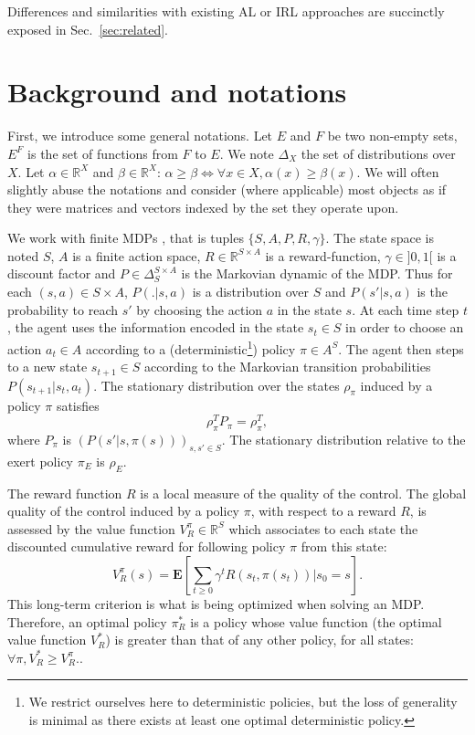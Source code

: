 \documentclass[smallextended]{svjour3}
\newcommand{\E}{\mathbf{E}}
\begin{document}
Differences and similarities with existing AL or IRL approaches are succinctly exposed in Sec.~\ref{sec:related}.
\section{Background and notations}
\label{sec:background}
First, we introduce some general notations.
Let $E$ and $F$ be two non-empty sets, $E^F$ is the set of functions from $F$ to $E$.
We note $\Delta_X$ the set of distributions over $X$.
Let $\alpha\in\mathbb{R}^X$ and $\beta\in\mathbb{R}^X$: $\alpha\geq\beta \Leftrightarrow \forall x\in X, \alpha(x) \geq \beta(x)$. We will often slightly abuse the notations and consider (where applicable) most objects as if they were matrices and vectors indexed by the set they operate upon.

We work with finite MDPs \cite{puterman1994markov}, that is tuples $\{S,A,P,R,\gamma\}$. The state space is noted $S$, $A$ is a finite action space, $R\in\mathbb{R}^{S\times A}$ is a reward-function, $\gamma\in ]0,1[$ is a discount factor and $P\in \Delta_{S}^{S\times A}$ is the Markovian dynamic of the MDP. Thus for each $(s,a)\in S\times A$, $P(.|s,a)$ is a distribution over $S$ and $P(s'|s,a)$ is the probability to reach $s'$ by choosing the action $a$ in the state $s$. At each time step $t$, the agent uses the information encoded in the state $s_t\in S$ in order to choose an action $a_t \in A$ according to a (deterministic\footnote{We restrict ourselves here to deterministic policies, but the loss of generality is minimal as there exists at least one optimal deterministic policy.}) policy $\pi\in A^S$. The agent then steps to a new state $s_{t+1}\in S$ according to the Markovian transition probabilities $P(s_{t+1}|s_t,a_t)$. The stationary distribution over the states $\rho_\pi$ induced by a policy $\pi$ satisfies
\begin{equation}
  \rho_\pi^TP_\pi = \rho_\pi^T,
  \end{equation}
where $P_\pi$ is $(P(s'|s,\pi(s)))_{s,s' \in S}$. The stationary distribution relative to the exert policy $\pi_E$ is $\rho_E$.

The reward function $R$ is a local measure of the quality of the control. The global quality of the control induced by a policy $\pi$, with respect to a reward $R$, is assessed by the value function $V^\pi_R \in \mathbb{R}^{S}$ which associates to each state the discounted cumulative reward for following policy $\pi$ from this state:
\begin{equation}
V^\pi_R(s) = \E[\sum_{t\geq 0}\gamma^tR(s_t,\pi(s_t))|s_0 = s].
\end{equation}
This long-term criterion is what is being optimized when solving an MDP. Therefore, an optimal policy $\pi^*_R$ is a policy whose value function (the optimal value function $V^*_R$) is greater than that of any other policy, for all states: $\forall \pi, V^*_R\geq V^\pi_R$..
\end{document}
